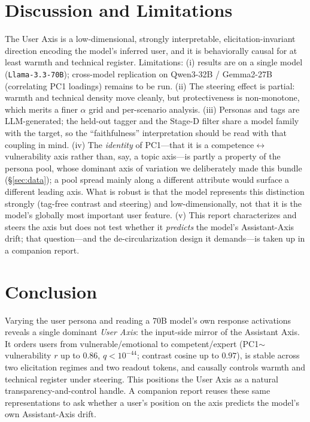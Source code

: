 \documentclass{article}
\begin{document}
\section{Discussion and Limitations}
The User Axis is a low-dimensional, strongly interpretable, elicitation-invariant
direction encoding the model's inferred user, and it is behaviorally causal for
at least warmth and technical register. Limitations: (i) results are on a single
model (\texttt{Llama-3.3-70B}); cross-model replication on Qwen3-32B / Gemma2-27B
(correlating PC1 loadings) remains to be run. (ii) The steering effect is partial:
warmth and technical density move cleanly, but protectiveness is non-monotone,
which merits a finer $\alpha$ grid and per-scenario analysis. (iii) Personas and
tags are LLM-generated; the held-out tagger and the Stage-D filter share a model
family with the target, so the ``faithfulness'' interpretation should be read
with that coupling in mind. (iv) The \emph{identity} of PC1---that it is a
competence$\leftrightarrow$vulnerability axis rather than, say, a topic axis---is
partly a property of the persona pool, whose dominant axis of variation we
deliberately made this bundle (\S\ref{sec:data}); a pool spread mainly along a
different attribute would surface a different leading axis. What is robust is that
the model represents this distinction strongly (tag-free contrast and steering) and
low-dimensionally, not that it is the model's globally most important user feature.
(v) This report characterizes and steers the axis but does not test whether it
\emph{predicts} the model's Assistant-Axis drift; that question---and the
de-circularization design it demands---is taken up in a companion report.

\section{Conclusion}
Varying the user persona and reading a $70$B model's own response activations
reveals a single dominant \emph{User Axis}: the input-side mirror of the
Assistant Axis. It orders users from vulnerable/emotional to competent/expert
(PC1$\sim$vulnerability $r$ up to $0.86$, $q{<}10^{-44}$; contrast cosine up to
$0.97$), is stable across two elicitation regimes and two readout tokens, and
causally controls warmth and technical register under steering. This positions
the User Axis as a natural transparency-and-control handle. A companion report
reuses these same representations to ask whether a user's position on the axis
predicts the model's own Assistant-Axis drift.
\end{document}
